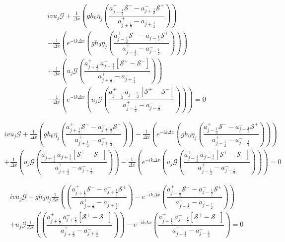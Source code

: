 \documentclass[12pt]{article}
\begin{document}
\begin{multline}
iv u_j\mathcal{G} + \frac{1}{\Delta x}\left(gh_0\eta_j \left(\dfrac{a^+_{j+\frac{1}{2}} \mathcal{S^-} - a^-_{j+\frac{1}{2}} \mathcal{S^+} }{a^+_{j+\frac{1}{2}} - a^-_{j+\frac{1}{2}}}\right) \right)  \\
- \frac{1}{\Delta x}\left(e^{-ik\Delta x}\left(gh_0\eta_j \left(\dfrac{a^+_{j-\frac{1}{2}} \mathcal{S^-} - a^-_{j-\frac{1}{2}} \mathcal{S^+} }{a^+_{j-\frac{1}{2}} - a^-_{j-\frac{1}{2}}}\right)  \right) \right) \\
+ \frac{1}{\Delta x}\left(u_j\mathcal{G} \left(\dfrac{a^+_{j+\frac{1}{2}} \, a^-_{j+\frac{1}{2}}\left [ \mathcal{S^+} -\mathcal{S^-} \right ] }{a^+_{j+\frac{1}{2}} - a^-_{j+\frac{1}{2}}}\right) \right)  \\
- \frac{1}{\Delta x}\left(e^{-ik\Delta x}\left(u_{j} \mathcal{G} \left(\dfrac{a^+_{j-\frac{1}{2}} \, a^-_{j-\frac{1}{2}}\left [ \mathcal{S^+} -\mathcal{S^-} \right ] }{a^+_{j-\frac{1}{2}} - a^-_{j-\frac{1}{2}}}\right)\right)  \right)  = 0
\end{multline}

\begin{multline}
iv u_j\mathcal{G} + \frac{1}{\Delta x}\left(gh_0\eta_j \left(\dfrac{a^+_{j+\frac{1}{2}} \mathcal{S^-} - a^-_{j+\frac{1}{2}} \mathcal{S^+} }{a^+_{j+\frac{1}{2}} - a^-_{j+\frac{1}{2}}}\right) \right)  
- \frac{1}{\Delta x}\left(e^{-ik\Delta x}\left(gh_0\eta_j \left(\dfrac{a^+_{j-\frac{1}{2}} \mathcal{S^-} - a^-_{j-\frac{1}{2}} \mathcal{S^+} }{a^+_{j-\frac{1}{2}} - a^-_{j-\frac{1}{2}}}\right)  \right) \right) \\
+ \frac{1}{\Delta x}\left(u_j\mathcal{G} \left(\dfrac{a^+_{j+\frac{1}{2}} \, a^-_{j+\frac{1}{2}}\left [ \mathcal{S^+} -\mathcal{S^-} \right ] }{a^+_{j+\frac{1}{2}} - a^-_{j+\frac{1}{2}}}\right) \right) 
- \frac{1}{\Delta x}\left(e^{-ik\Delta x}\left(u_{j} \mathcal{G} \left(\dfrac{a^+_{j-\frac{1}{2}} \, a^-_{j-\frac{1}{2}}\left [ \mathcal{S^+} -\mathcal{S^-} \right ] }{a^+_{j-\frac{1}{2}} - a^-_{j-\frac{1}{2}}}\right)\right)  \right)  = 0
\end{multline}

\begin{multline}
iv u_j\mathcal{G} + gh_0\eta_j \frac{1}{\Delta x} \left(  \left(\dfrac{a^+_{j+\frac{1}{2}} \mathcal{S^-} - a^-_{j+\frac{1}{2}} \mathcal{S^+} }{a^+_{j+\frac{1}{2}} - a^-_{j+\frac{1}{2}}}\right) 
- e^{-ik\Delta x} \left(\dfrac{a^+_{j-\frac{1}{2}} \mathcal{S^-} - a^-_{j-\frac{1}{2}} \mathcal{S^+} }{a^+_{j-\frac{1}{2}} - a^-_{j-\frac{1}{2}}}\right)  \right)\\
+ u_j\mathcal{G} \frac{1}{\Delta x}\left( \left(\dfrac{a^+_{j+\frac{1}{2}} \, a^-_{j+\frac{1}{2}}\left [ \mathcal{S^+} -\mathcal{S^-} \right ] }{a^+_{j+\frac{1}{2}} - a^-_{j+\frac{1}{2}}}\right) \right) 
- e^{-ik\Delta x}\left(\dfrac{a^+_{j-\frac{1}{2}} \, a^-_{j-\frac{1}{2}}\left [ \mathcal{S^+} -\mathcal{S^-} \right ] }{a^+_{j-\frac{1}{2}} - a^-_{j-\frac{1}{2}}}\right) = 0
\end{multline}
\end{document}
